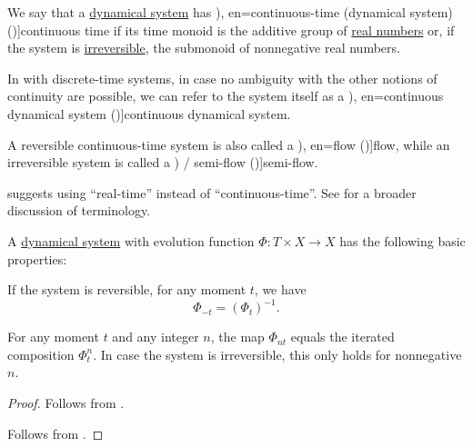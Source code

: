\begin{definition}\label{def:continuous_dynamical_system}\mimprovised
  We say that a \hyperref[def:dynamical_system]{dynamical system} has \term[ru=(динамическая система с) непрерывным временем (\cite[8]{Юмагулов2015ДинамическиеСистемы}), en=continuous-time (dynamical system) (\cite[2]{BrinStuck2002DynamicalSystems})]{continuous time} if its time monoid is the additive group of \hyperref[def:real_numbers]{real numbers} or, if the system is \hyperref[def:reversible_dynamical_system]{irreversible}, the submonoid of nonnegative real numbers.

  In with discrete-time systems, in case no ambiguity with the other notions of continuity are possible, we can refer to the system itself as a \term[ru=непрарывная динамическая система (\cite[8]{Юмагулов2015ДинамическиеСистемы}), en=continuous dynamical system (\cite[21]{Müller2022HandbookOfDynamicsAndProbability})]{continuous dynamical system}.

  A reversible continuous-time system is also called a \term[ru=поток (\cite[10]{Юмагулов2015ДинамическиеСистемы}), en=flow (\cite[2]{BrinStuck2002DynamicalSystems})]{flow}, while an irreversible system is called a \term[en=semiflow (\cite[2]{BrinStuck2002DynamicalSystems}) / semi-flow (\cite[363]{Rozikov2012MultiDimensionalTimeDynamicalSystem})]{semi-flow}.
\end{definition}
\begin{comments}
  \item {} suggests using \enquote{real-time} instead of \enquote{continuous-time}. See  for a broader discussion of terminology.
\end{comments}

\begin{proposition}\label{thm:def:dynamical_system}
  A \hyperref[def:dynamical_system]{dynamical system} with evolution function \( \Phi: T \times X \to X \) has the following basic properties:
  \begin{thmenum}
     If the system is reversible, for any moment \( t \), we have
    \begin{equation}\label{eq:thm:def:dynamical_system/negation}
      \Phi_{-t} = (\Phi_t)^{-1}.
    \end{equation}

     For any moment \( t \) and any integer \( n \), the map \( \Phi_{nt} \) equals the iterated composition \( \Phi_t^n \). In case the system is irreversible, this only holds for nonnegative \( n \).
  \end{thmenum}
\end{proposition}
\begin{proof}
   Follows from .

   Follows from .
\end{proof}

